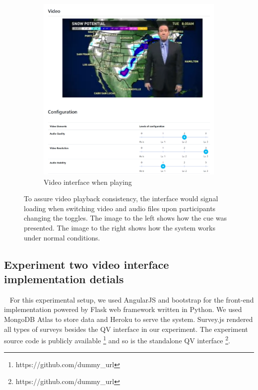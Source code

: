 \begin{figure}
\begin{subfigure}[ht]{0.49\textwidth}
         \includegraphics[width=\textwidth]{content/image/player.png}
         \caption{Video interface when playing}
         \label{fig:video_playing}
     \end{subfigure}
        \caption{To assure video playback consistency, the interface would signal loading when switching video and audio files upon participants changing the toggles. The image to the left shows how the cue was presented. The image to the right shows how the system works under normal conditions.}
        \label{fig:appendix_video_interface}
\end{figure}

\subsection{Experiment two video interface implementation detials}~\label{appx_video_interface}
For this experimental setup, we used AngularJS and bootstrap for the front-end implementation powered by Flask web framework written in Python. We used MongoDB Atlas to store data and Heroku to serve the system. Survey.js rendered all types of surveys besides the QV interface in our experiment. The experiment source code is publicly available \footnote{https://github.com/dummy\_url} and so is the standalone QV interface \footnote{https://github.com/dummy\_url}.

